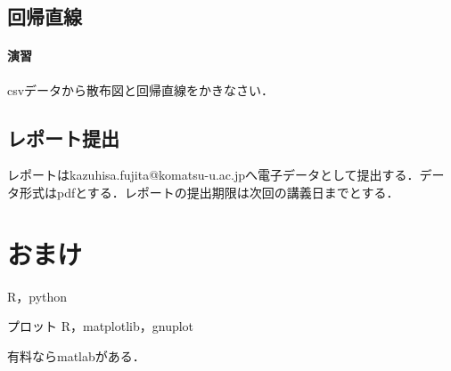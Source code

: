 \documentclass[12pt, a4j]{jsreport}
\begin{document}
\subsection{回帰直線}



\paragraph{演習}

csvデータから散布図と回帰直線をかきなさい．


\subsection{レポート提出}

レポートはkazuhisa.fujita@komatsu-u.ac.jpへ電子データとして提出する．データ形式はpdfとする．レポートの提出期限は次回の講義日までとする．

\section{おまけ}

R，python

プロット
R，matplotlib，gnuplot


有料ならmatlabがある．
\end{document}
